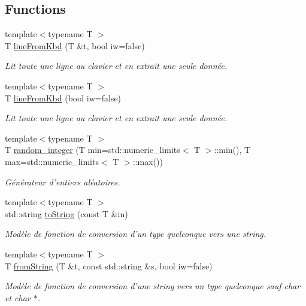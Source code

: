 \subsection*{Functions}
\begin{DoxyCompactItemize}
\item 
{\footnotesize template$<$typename T $>$ }\\T \hyperlink{namespacenvs_a67222c9b17e02e6d95a7559f92ec4daf}{line\+From\+Kbd} (T \&t, bool iw=false)
\begin{DoxyCompactList}\small\item\em Lit toute une ligne au clavier et en extrait une seule donnée. \end{DoxyCompactList}\item 
{\footnotesize template$<$typename T $>$ }\\T \hyperlink{namespacenvs_a5c923479773c4d277d92d9e7a75b4567}{line\+From\+Kbd} (bool iw=false)
\begin{DoxyCompactList}\small\item\em Lit toute une ligne au clavier et en extrait une seule donnée. \end{DoxyCompactList}\item 
{\footnotesize template$<$typename T $>$ }\\T \hyperlink{namespacenvs_aeb20a15a022be7b92a30006fcd03ffca}{random\+\_\+integer} (T min=std\+::numeric\+\_\+limits$<$ T $>$\+::min(), T max=std\+::numeric\+\_\+limits$<$ T $>$\+::max())
\begin{DoxyCompactList}\small\item\em Générateur d'entiers aléatoires. \end{DoxyCompactList}\item 
{\footnotesize template$<$typename T $>$ }\\std\+::string \hyperlink{namespacenvs_aee50f16a11273a42501cb44b7a31610d}{to\+String} (const T \&in)
\begin{DoxyCompactList}\small\item\em Modèle de fonction de conversion d'un type quelconque vers une {\ttfamily string}. \end{DoxyCompactList}\item 
{\footnotesize template$<$typename T $>$ }\\T \hyperlink{namespacenvs_a96cda281b4b965c337c5a6bda3262a51}{from\+String} (T \&t, const std\+::string \&s, bool iw=false)
\begin{DoxyCompactList}\small\item\em Modèle de fonction de conversion d'une {\ttfamily string} vers un type quelconque {\itshape sauf} {\ttfamily char} et {\ttfamily char $\ast$}. \end{DoxyCompactList}\item 

\end{DoxyCompactItemize}
